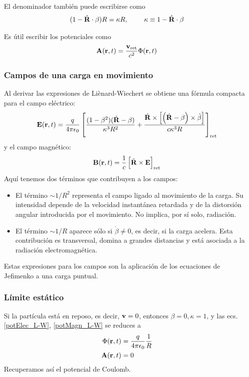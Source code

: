 \documentclass[]{article}
\numberwithin{equation}{section}
\begin{document}
El denominador también puede escribirse como
\begin{equation}
	(1 - \hat{\mathbf{R}}\cdot\mathbf{\beta})R = \kappa R, ~~~~~~~ \kappa\equiv 1 - \hat{\mathbf{R}}\cdot\mathbf{\beta}
\end{equation}

Es útil escribir los potenciales como
\begin{equation}
	\mathbf{A}(\mathbf{r},t) = \frac{\mathbf{v}_{\mathrm{ret}}}{c^2} \Phi(\mathbf{r},t)
\end{equation}

\subsubsection{Campos de una carga en movimiento}
Al derivar las expresiones de Liènard-Wiechert se obtiene una fórmula compacta para el campo eléctrico:
\begin{equation}
	\n{E}(\rv,t) = \ke[q] \left[\frac{(1 - \beta^2)(\Rhat - \beta)}{\kappa^3 R^2} + \frac{\Rhat\times\left[\left(\Rhat - \beta\right)\times\dot{\beta}\right]}{c \kappa^3 R}\right]_{\mathrm{ret}}
\end{equation}
y el campo magnético:
\begin{equation}
	\mathbf{B}(\mathbf{r}, t) = \frac{1}{c}\left[\hat{\mathbf{R}}\times\mathbf{E}\right]_{\mathrm{ret}}
\end{equation}
Aquí tenemos dos términos que contribuyen a los campos:
\begin{itemize}
	\item El término \(\sim 1/R^2\) representa el campo ligado al movimiento de la carga. Su intensidad depende de la velocidad instantánea retardada y de la distorsión angular introducida por el movimiento. No implica, por sí solo, radiación.
	
	\item El término \(\sim 1/R\) aparece sólo si \(\dot{\beta}\neq 0\), es decir, si la carga acelera. Esta contribución es transversal, domina a grandes distancias y está asociada a la radiación electromagnética.
\end{itemize}
Estas expresiones para los campos son la aplicación de los ecuaciones de Jefimenko a una carga puntual.

\subsubsection{Límite estático}
Si la partícula está en reposo, es decir, \(\mathbf{v} = 0\), entonces \(\beta = 0, \kappa = 1\), y las ecs. \ref{potElec_L-W}, \ref{potMagn_L-W} se reduces a
\begin{align*}
	\Phi(\rv,t) &= \ke[q] \frac{1}{R}\\
	\n{A}(\rv,t) &= 0
\end{align*}
Recuperamos así el potencial de Coulomb.
\end{document}
